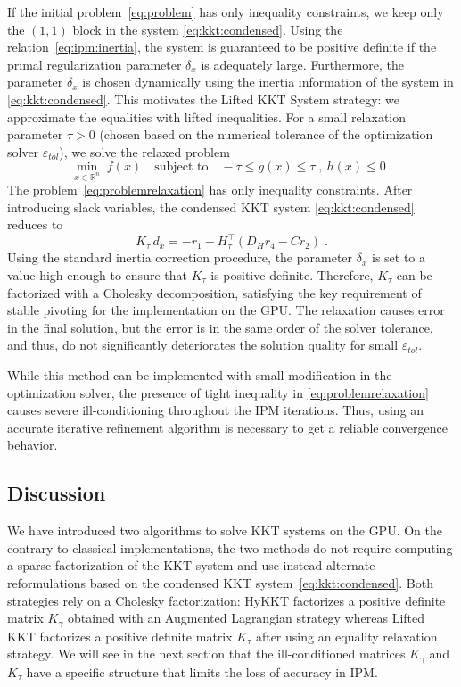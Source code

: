 If the initial problem~\eqref{eq:problem} has only inequality constraints,
we keep only the $(1,1)$ block in the system \eqref{eq:kkt:condensed}.
Using the relation~\eqref{eq:ipm:inertia}, the system
is guaranteed to be positive definite if the primal regularization parameter $\delta_x$ is adequately large.
Furthermore, the parameter $\delta_x$ is chosen dynamically using the inertia information of the system in \eqref{eq:kkt:condensed}. This motivates the Lifted KKT System strategy: we approximate the equalities with lifted inequalities.
For a small relaxation parameter $\tau > 0$ (chosen based on the numerical tolerance of the optimization solver
$\varepsilon_{tol}$), we solve the relaxed problem
\begin{equation}
  \label{eq:problemrelaxation}
    \min_{x \in \mathbb{R}^n} \;  f(x)
\quad \text{subject to}\quad
     - \tau \leq g(x) \leq \tau \;,~  h(x) \leq 0  \; .
\end{equation}
The problem~\eqref{eq:problemrelaxation} has only inequality constraints. After introducing slack variables, the condensed KKT system
\eqref{eq:kkt:condensed} reduces to
\begin{equation}
  \label{eq:liftedkkt}
    K_\tau \,d_x = - r_1 - H_\tau^\top(D_H r_4 - C r_2) \; .
\end{equation}
Using the standard inertia correction procedure, the parameter $\delta_x$ is set to a value high enough to ensure that  $K_\tau$ is positive definite. Therefore, $K_\tau$ can be factorized with a Cholesky decomposition, satisfying the key requirement of stable pivoting for the implementation on the GPU. The relaxation causes error in the final solution, but the error is in the same order of the solver tolerance, and thus, do not significantly deteriorates the solution quality for small $\varepsilon_{tol}$.

While this method can be implemented with small modification in the optimization solver, the presence of tight inequality in \eqref{eq:problemrelaxation} causes severe ill-conditioning throughout the IPM iterations. Thus,
using an accurate iterative refinement algorithm is necessary to get a reliable convergence behavior.

\subsection{Discussion}
We have introduced two algorithms to solve
KKT systems on the GPU. On the contrary to classical implementations,
the two methods do not require computing a sparse \lblt factorization of the KKT
system and use instead alternate reformulations based on the condensed KKT
system~\eqref{eq:kkt:condensed}. Both strategies
rely on a Cholesky factorization: HyKKT factorizes a positive
definite matrix $K_\gamma$ obtained with an Augmented Lagrangian strategy
whereas Lifted KKT factorizes a positive definite matrix $K_\tau$
after using an equality relaxation strategy.
We will see in the next section that the ill-conditioned matrices $K_\gamma$ and $K_\tau$
have a specific structure that limits the loss of accuracy in IPM.


